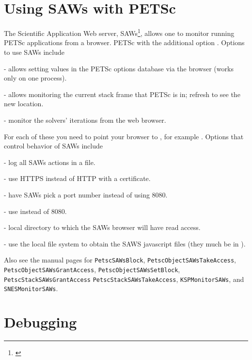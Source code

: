 {{{\section{Using SAWs with PETSc} \label{sec_saws}
The Scientific Application Web server,
SAWs\footnote{\href{https://bitbucket.org/saws/saws/wiki/Home}{}},
allows one to monitor running PETSc applications from a browser.
 PETSc with the additional option .
Options to use SAWs include
\begin{tightitemize}
  \item{} - allows setting values in the PETSc options database via the browser (works only on one process).
  \item{} - allows monitoring the current stack frame that PETSc is in; refresh to see the new location.
  \item{} - monitor the solvers' iterations from the web browser.
\end{tightitemize}
For each of these you need to point your browser to , for example .
Options that control behavior of SAWs include
\begin{tightitemize}
  \item{} - log all SAWs actions in a file.
  \item{} - use HTTPS instead of HTTP with a certificate.
  \item{} - have SAWs pick a port number instead of using 8080.
  \item{} - use  instead of 8080.
  \item{} - local directory to which the SAWs browser will have read access.
  \item{} - use the local file system to obtain the SAWS javascript files (they much be in ).
\end{tightitemize}
Also see the manual pages for \lstinline{PetscSAWsBlock}, \lstinline{PetscObjectSAWsTakeAccess},
\lstinline{PetscObjectSAWsGrantAccess}, \lstinline{PetscObjectSAWsSetBlock}, \lstinline{PetscStackSAWsGrantAccess}
\lstinline{PetscStackSAWsTakeAccess}, \lstinline{KSPMonitorSAWs}, and \lstinline{SNESMonitorSAWs}.

\section{Debugging}  \label{sec_debugging}

}}}
